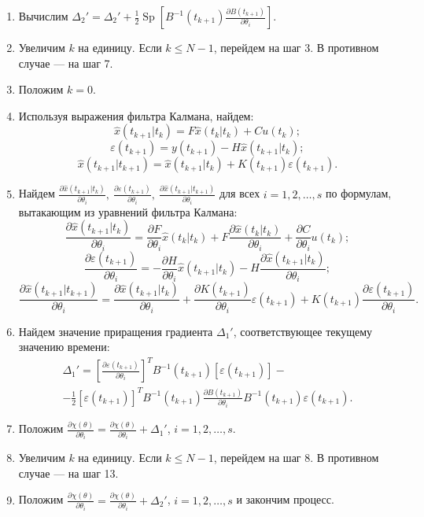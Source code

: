 \documentclass[a4paper,14pt]{extarticle}
\DeclareMathOperator{\Sp}{Sp}
\newcommand{\pred}[0]{t_{k+1}|t_k}
\newcommand{\est}[0]{t_k|t_k}
\newcommand{\fut}[0]{t_{k+1}}
\newcommand{\estfut}[0]{t_{k+1}|t_{k+1}}
\newcommand{\pd}[2]{\frac{\partial #1}{\partial #2}}
\newcommand{\pdpk}[1]{\pd{#1}{\theta_i}}
\newcommand{\inv}[1]{#1^{-1}}
\newcommand{\eps}{\varepsilon}
\begin{document}
\begin{enumerate}
\item Вычислим $\Delta_2' = \Delta_2' + \frac{1}{2} \Sp \left[ \inv{B}(\fut)
\pdpk{B(\fut)} \right].$

\item Увеличим $k$ на единицу. Если $k \le N-1$, перейдем на шаг 3. В противном
случае --- на шаг 7.

\item Положим $k = 0$.

\item Используя выражения фильтра Калмана, найдем:
\[
  \hat{x}(\pred) = F \hat{x}(\est) + C u(t_k);
\]
\[
  \eps(\fut) = y(\fut) - H \hat{x}(\pred);
\]
\[
  \hat{x}(\estfut) = \hat{x}(\pred) + K(\fut) \eps(\fut).
\]

\item Найдем $\pdpk{\hat{x}(\pred)},\ \pdpk{\eps(\fut)},\
\pdpk{\hat{x}(\estfut)}$ для всех $i = 1, 2, \ldots, s$ по формулам, вытакающим
из уравнений фильтра Калмана:
\[
  \pdpk{\hat{x}(\pred)} = \pdpk{F} \hat{x}(\est) + F \pdpk{\hat{x}(\est)} +
  \pdpk{C} u(t_k);
\]
\[
  \pdpk{\eps(\fut)} = -\pdpk{H} \hat{x}(\pred) - H \pdpk{\hat{x}(\pred)};
\]
\[
  \pdpk{\hat{x}(\estfut)} = \pdpk{\hat{x}(\pred)} + \pdpk{K(\fut)} \eps(\fut) +
  K(\fut) \pdpk{\eps(\fut)}.
\]

\item Найдем значение приращения градиента $\Delta_1'$, соответствующее
текущему значению времени:
\begin{equation*}
\begin{split}
  \Delta_1' = \left[ \pdpk{\eps(\fut)} \right]^T \inv{B}(\fut)
  \left[ \eps(\fut) \right] - \\ - \frac{1}{2} \left[ \eps(\fut) \right]^T
  \inv{B}(\fut) \pdpk{B(\fut)} \inv{B}(\fut) \eps(\fut).
\end{split}
\end{equation*}

\item Положим $\pdpk{\chi(\theta)} = \pdpk{\chi(\theta)} + \Delta_1'$,
$i = 1, 2, \ldots, s$.

\item Увеличим $k$ на единицу. Если $k \le N-1$, перейдем на шаг 8.
В противном случае --- на шаг 13.

\item Положим $\pdpk{\chi(\theta)} = \pdpk{\chi(\theta)} + \Delta_2'$,
$i = 1, 2, \ldots, s$ и закончим процесс.

\end{enumerate}
\end{document}
